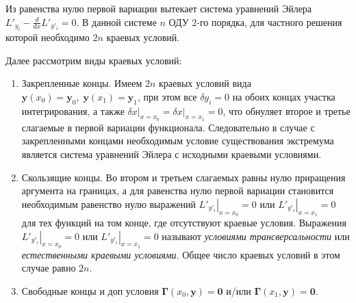 Из равенства нулю первой вариации вытекает система уравнений Эйлера $L'_{y_i}-\frac{d}{dx}L'_{y'_i}=0$. В данной системе $n$ ОДУ 2-го порядка, для частного решения которой необходимо $2n$ краевых условий.

Далее рассмотрим виды краевых условий:
\begin{enumerate}
	\item Закрепленные концы.
	Имеем $2n$ краевых условий вида $\mathbf{y}(x_0)=\mathbf{y}_0,\;\mathbf{y}(x_1)=\mathbf{y}_1$, при этом все $\delta y_i=0$ на обоих концах участка интегрирования, а также $\left.\delta x\right|_{x=x_0}=\left.\delta x\right|_{x=x_1}=0$, что обнуляет второе и третье слагаемые в первой вариации функционала. Следовательно в случае с закрепленными концами необходимым условие существования экстремума является система уравнений Эйлера с исходными краевыми условиями.
	
	\item Скользящие концы. Во втором и третьем слагаемых равны нулю приращения аргумента на границах, а для равенства нулю первой вариации становится необходимым равенство нулю выражений $\left.L'_{y'_i}\right|_{x=x_0}=0$ или $\left.L'_{y'_i}\right|_{x=x_1}=0$ для тех функций на том конце, где отсутствуют краевые условия. Выражения $\left.L'_{y'_i}\right|_{x=x_0}=0$ или $\left.L'_{y'_i}\right|_{x=x_1}=0$ называют \textit{условиями трансверсальности} или \textit{естественными краевыми условиями}. Общее число краевых условий в этом случае равно $2n$.
	
	\item Свободные концы и доп условия $\mathbf{\Gamma}(x_0, \mathbf{y})=\mathbf{0}$ и/или $\mathbf{\Gamma}(x_1, \mathbf{y})=\mathbf{0}$.
	

\end{enumerate}
